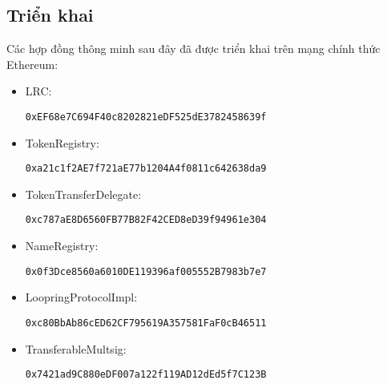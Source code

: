 \documentclass[12pt,a4paper]{article}
\begin{document}
\begin{multicols}{2}
\begin{appendices}
\subsection{Triển khai}
Các hợp đồng thông minh sau đây đã được triển khai trên mạng chính thức Ethereum:
\begin{small}
\begin{itemize}
\item LRC: 

\verb|0xEF68e7C694F40c8202821eDF525dE3782458639f|
\item TokenRegistry: 

 \verb|0xa21c1f2AE7f721aE77b1204A4f0811c642638da9|
\item TokenTransferDelegate: 

 \verb|0xc787aE8D6560FB77B82F42CED8eD39f94961e304|
\item NameRegistry:  

\verb|0x0f3Dce8560a6010DE119396af005552B7983b7e7|
\item LoopringProtocolImpl:  

\verb|0xc80BbAb86cED62CF795619A357581FaF0cB46511|
\item TransferableMultsig: 

 \verb|0x7421ad9C880eDF007a122f119AD12dEd5f7C123B|
\end{itemize}
\end{small}
\end{appendices}

\end{multicols}
\end{document}
